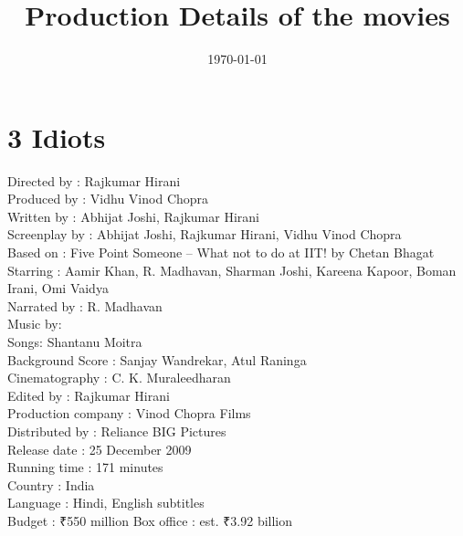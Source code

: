 \documentclass[11pt]{article}
\title{Production Details of the movies}
\date{\today}
\author{}
\begin{document}
\maketitle
\section*{3 Idiots}
Directed by	: Rajkumar Hirani\\
Produced by	: Vidhu Vinod Chopra\\
Written by	: Abhijat Joshi, Rajkumar Hirani\\
Screenplay by : Abhijat Joshi, Rajkumar Hirani, Vidhu Vinod Chopra\\
Based on : Five Point Someone – What not to do at IIT! by Chetan Bhagat\\
Starring : Aamir Khan, R. Madhavan, Sharman Joshi, Kareena Kapoor, Boman Irani, Omi Vaidya\\
Narrated by : R. Madhavan\\
Music by:\\
Songs: Shantanu Moitra\\
Background Score : Sanjay Wandrekar, Atul Raninga\\
Cinematography : C. K. Muraleedharan\\
Edited by : Rajkumar Hirani\\
Production company : Vinod Chopra Films\\
Distributed by : Reliance BIG Pictures\\
Release date : 25 December 2009\\
Running time : 171 minutes\\
Country	: India\\
Language : Hindi, English subtitles\\
Budget : ₹550 million
Box office : est. ₹3.92 billion
\end{document}
